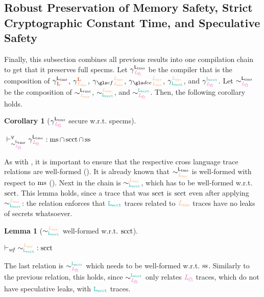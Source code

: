 \documentclass[acmsmall]{acmart}
\theoremstyle{definition}
\newtheorem{lemma}{Lemma}[section]
\newtheorem{corollary}{Corollary}[section]
\begin{document}
\subsection{Robust Preservation of Memory Safety, Strict Cryptographic Constant Time, and Speculative Safety}

Finally, this subsection combines all previous results into one compilation chain to get that it preserves full \gls*{specms}.
Let $\ccspecms$ be the compiler that is the composition of $\cca$, $\ccb$, $\cccf$, $\ccdce$, $\ccscct$, and $\ccspec$. 
Let $\sim^{\Ltms}_{\Lspec}$ be the composition of $\sim^{\Ltms}_{\Lms}$, $\sim^{\Lms}_{\Lscct}$, and $\sim^{\Lscct}_{\Lspec}$.
Then, the following corollary holds.

\begin{corollary}[$\ccspecms$ secure w.r.t. \gls*{specms}]\label{thm:ccall:rtp:specms}
  $\;$ 

  \begin{nscenter}
    $\rtpsim{\cc{\Ltms}{\Lspec}}{\mssafe\cap\scctsafe\cap\sssafe}{\sim^{\Ltms}_{\Lspec}}$ %
  \end{nscenter}
\end{corollary}

As with , it is important to ensure that the respective cross language trace relations are well-formed ().
It is already known that $\sim^{\Ltms}_{\Lms}$ is well-formed with respect to $\operatorname{ms}$ ().
Next in the chain is $\sim^{\Lms}_{\Lscct}$, which has to be well-formed w.r.t. $\operatorname{scct}$.
This lemma holds, since a trace that was $\operatorname{scct}$ is $\operatorname{scct}$ even after applying $\sim^{\Lms}_{\Lscct}$: the relation enforces that $\Lscct$ traces related to $\Lms$ traces have no leaks of secrets whatsoever.

\begin{lemma}[$\sim^{\Lms}_{\Lscct}$ well-formed w.r.t. $\operatorname{scct}$]\label{lem:wf:lsmslscct}
$\;$ 

  \begin{nscenter}
  $\wfcsig{\sim^{\Lms}_{\Lscct}}{\scctsafe}$
  \end{nscenter}
\end{lemma}

The last relation is $\sim^{\Lscct}_{\Lspec}$ which needs to be well-formed w.r.t. $\operatorname{ss}$.
Similarly to the previous relation, this holds, since $\sim^{\Lscct}_{\Lspec}$ only relates $\Lspec$ traces, which do not have speculative leaks, with $\Lscct$ traces.
\end{document}
